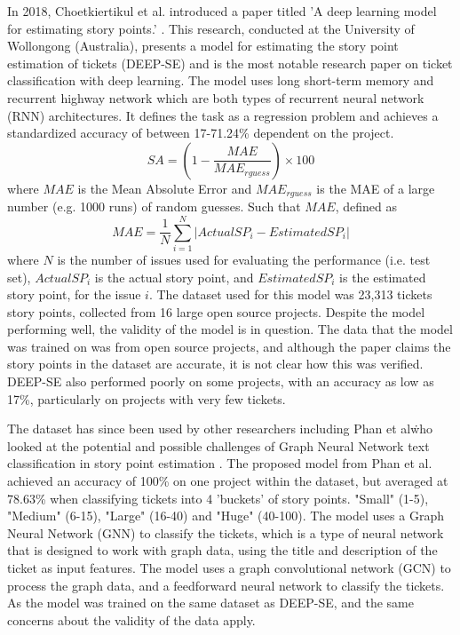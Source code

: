 \documentclass{UoYCSproject}
\begin{document}
    In 2018, Choetkiertikul et al.
    introduced a paper titled 'A deep learning model for estimating story points.' \cite{8255666}.
    This research, conducted at the University of Wollongong (Australia), presents a model for estimating the story point estimation of tickets (DEEP-SE) and is the most notable research paper on ticket classification with deep learning.
    The model uses long short-term memory and recurrent highway network which are both types of recurrent neural network (RNN) architectures.
    It defines the task as a regression problem and achieves a standardized accuracy of between 17-71.24\% dependent on the project.
    \[SA = (1-\frac{MAE}{MAE_{rguess}}) \times 100\]
    where $MAE$ is the Mean Absolute Error and $MAE_{rguess}$ is the MAE of a large number (e.g. 1000 runs) of random guesses. Such that $MAE$, defined as \[ MAE = \frac{1}{N}\sum_{i=1}^{N}|ActualSP_{i} - EstimatedSP_{i}|\] where $N$ is the number of issues used for evaluating the performance (i.e. test set), $ActualSP_i$ is the actual story point, and $EstimatedSP_i$ is the estimated story point, for the issue $i$.
    The dataset used for this model was 23,313 tickets story points, collected from 16 large open source projects.
    Despite the model performing well, the validity of the model is in question. The data that the model was trained on was from open source projects, and although the paper claims the story points in the dataset are accurate, it is not clear how this was verified. DEEP-SE also performed poorly on some projects, with an accuracy as low as 17\%, particularly on projects with very few tickets.

    The dataset has since been used by other researchers including Phan et al\. who looked at the potential and possible challenges of Graph Neural Network text
    classification in story point estimation \cite{phan2022story}.
    The proposed model from Phan et al. achieved an accuracy of 100\% on one project within the dataset, but averaged at 78.63\% when classifying tickets into 4 'buckets' of story points. "Small" (1-5), "Medium" (6-15), "Large" (16-40) and "Huge" (40-100).
    The model uses a Graph Neural Network (GNN) to classify the tickets, which is a type of neural network that is designed to work with graph data, using the title and description of the ticket as input features. The model uses a graph convolutional network (GCN) to process the graph data, and a feedforward neural network to classify the tickets.
    As the model was trained on the same dataset as DEEP-SE, and the same concerns about the validity of the data apply.
\end{document}

